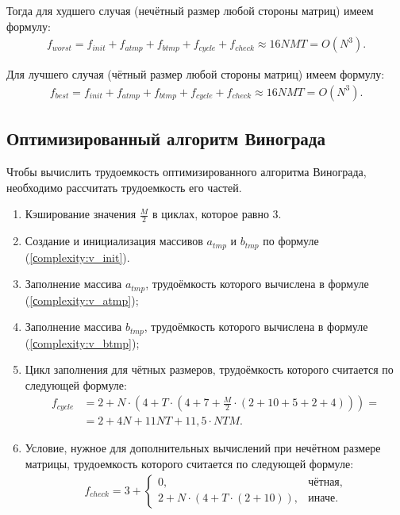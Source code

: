 Тогда для худшего случая (нечётный размер любой стороны матриц) имеем формулу:
\begin{equation}
	\label{сomplexity:vinograd_worst}
	\begin{gathered}
		f_{worst} = f_{init} + f_{atmp} + f_{btmp} + f_{cycle} + f_{check} \approx 16NMT = O(N^3).
	\end{gathered}
\end{equation}

Для лучшего случая (чётный размер любой стороны матриц) имеем формулу:
\begin{equation}
	\label{сomplexity:vinograd_best}
	\begin{gathered}
		f_{best} = f_{init} + f_{atmp} + f_{btmp} + f_{cycle} + f_{check} \approx 16NMT = O(N^3).
	\end{gathered}
\end{equation}

\subsection{Оптимизированный алгоритм Винограда}

Чтобы вычислить трудоемкость оптимизированного алгоритма Винограда, необходимо рассчитать трудоемкость его частей.
\begin{enumerate}
	\item Кэширование значения $\frac{M}{2}$ в циклах, которое равно 3.
	\item Создание и инициализация массивов $a_{tmp}$ и $b_{tmp}$ по формуле (\ref{сomplexity:v_init}).
	\item Заполнение массива $a_{tmp}$, трудоёмкость которого вычислена в формуле (\ref{сomplexity:v_atmp});
	\item Заполнение массива $b_{tmp}$, трудоёмкость которого вычислена в формуле (\ref{сomplexity:v_btmp});
	\item Цикл заполнения для чётных размеров, трудоёмкость которого считается по следующей формуле:
	\begin{equation}
		\label{сomplexity:v_opt_cycle}
		\begin{aligned}
			f_{cycle} &= 2 + N \cdot (4 + T \cdot (4 + 7 + \frac{M}{2} \cdot (2 + 10 + 5 + 2 + 4))) = \\
			&= 2 + 4N + 11NT + 11,5 \cdot NTM.
		\end{aligned}
	\end{equation}
	\item Условие, нужное для дополнительных вычислений при нечётном размере матрицы, трудоемкость которого считается по следующей формуле:
	\begin{equation}
		\label{сomplexity:v_opt_check}
		\begin{aligned}
			f_{check} = 3 +
			\begin{cases}
				0, & \text{чётная}, \\
				2 + N \cdot (4 + T \cdot (2 + 10)), & \text{иначе}.
			\end{cases}
		\end{aligned}
	\end{equation}
\end{enumerate}

